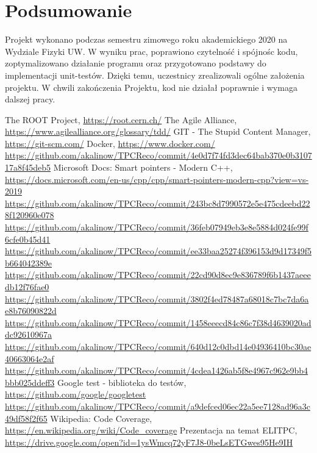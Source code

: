 \documentclass{article}
\begin{document}
\section{Podsumowanie}
Projekt wykonano podczas semestru zimowego roku akademickiego 2020 na Wydziale Fizyki UW. W wyniku prac, poprawiono czytelność i spójnośc kodu, zoptymalizowano działanie programu oraz przygotowano podstawy do implementacji unit-testów. Dzięki temu, uczestnicy zrealizowali ogólne założenia projektu. W chwili zakończenia Projektu, kod nie działał poprawnie i wymaga dalszej pracy.

\begin{thebibliography}{99}
        The ROOT Project, \url{https://root.cern.ch/}
        The Agile Alliance, \url{https://www.agilealliance.org/glossary/tdd/}
        GIT - The Stupid Content Manager, \url{https://git-scm.com/}
        Docker, \url{https://www.docker.com/}
        \url{https://github.com/akalinow/TPCReco/commit/4e0d7f74fd3dec64bab370e0b310717a8f45deb5}
        Microsoft Docs: Smart pointers - Modern C++, \url{https://docs.microsoft.com/en-us/cpp/cpp/smart-pointers-modern-cpp?view=vs-2019}
        \url{https://github.com/akalinow/TPCReco/commit/243bc8d7990572e5e475cdeebd228f120960e078}
        \url{https://github.com/akalinow/TPCReco/commit/36feb07949eb3e8e5884d024fe99f6cfe0b45d41}
        \url{https://github.com/akalinow/TPCReco/commit/ee33baa25274f396153d9d17349f5b664042389e}
        \url{https://github.com/akalinow/TPCReco/commit/22cd90d8ec9e836789f6b1437aeeedb12f76fae0}
        \url{https://github.com/akalinow/TPCReco/commit/3802f4ed78487a68018c7bc7da6ae8b76090822d}
        \url{https://github.com/akalinow/TPCReco/commit/1458eeecd84c86c7f38d4639020addc92610967a}
        \url{https://github.com/akalinow/TPCReco/commit/640d12c0dbd14e04936410bc30ae40663064e2af}
        \url{https://github.com/akalinow/TPCReco/commit/4cdea1426ab5f8e4967c962e9bb4bbb025ddeff3}
        Google test - biblioteka do testów, \url{https://github.com/google/googletest}
        \url{https://github.com/akalinow/TPCReco/commit/a9defced06ec22a5ee7128ad96a3c49df58f2f65}
        Wikipedia: Code Coverage, \url{https://en.wikipedia.org/wiki/Code\_coverage}
        Prezentacja na temat ELITPC, \url{https://drive.google.com/open?id=1ysWmcq72yF7J8-0beLsETGwes95He9IH}
\end{thebibliography}
\end{document}
